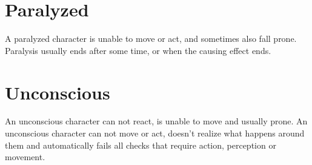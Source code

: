 \section{Paralyzed}
A paralyzed character is unable to move or act, and sometimes also fall prone. Paralysis usually ends after some time, or when the causing effect ends.

\section{Unconscious}
An unconscious character can not react, is unable to move and usually prone. An unconscious character can not move or act, doesn't realize what happens around them and automatically fails all checks that require action, perception or movement.
